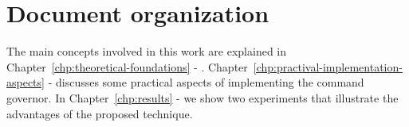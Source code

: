 \section{Document organization}%
\label{sec:organization}

The main concepts involved in this work are explained in
Chapter~\ref{chp:theoretical-foundations} -
.
Chapter~\ref{chp:practival-implementation-aspects} -
 discusses some practical aspects
of implementing the command governor. In Chapter~\ref{chp:results} -
 we show two experiments that illustrate the advantages of
the proposed technique.
